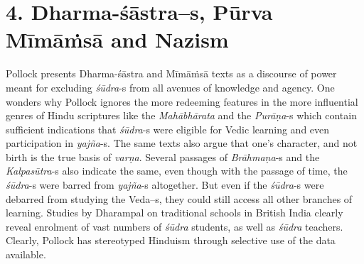 \vspace{-.3cm}

\section*{4. Dharma-śāstra--s, Pūrva Mīmāṁsā \hfill\break and Nazism}

Pollock presents Dharma-śāstra and Mīmāṁsā texts as a discourse of power meant for excluding \textit{śūdra}-s from all avenues of knowledge and agency. One wonders why Pollock ignores the more redeeming features in the more influential genres of Hindu scriptures like the \textit{Mahābhārata} and the \textit{Purāṇa}-s which contain sufficient indications that \textit{śūdra}-s were eligible for Vedic learning and even participation in \textit{yajña}-s. The same texts also argue that one’s character, and not birth is the true basis of \textit{varṇa}. Several passages of \textit{Brāhmaṇa}-s and the \textit{Kalpasūtra}-s also indicate the same, even though with the passage of time, the \textit{śūdra}-s were barred from \textit{yajña}-s altogether. But even if the \textit{śūdra}-s were debarred from studying the Veda--s, they could still access all other branches of learning. Studies by Dharampal on traditional schools in British India clearly reveal enrolment of vast numbers of \textit{śūdra} students, as well as \textit{śūdra} teachers. Clearly, Pollock has stereotyped Hinduism through selective use of the data available.

